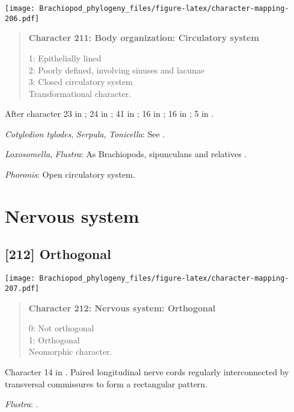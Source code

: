 \documentclass[openany]{book}
\theoremstyle{definition}
\theoremstyle{definition}
\theoremstyle{definition}
\theoremstyle{remark}
\begin{document}
\texttt{[image: Brachiopod\_phylogeny\_files/figure-latex/character-mapping-206.pdf]}

\begin{quote}
\textbf{Character 211: Body organization: Circulatory system}

1: Epithelially lined\\
2: Poorly defined, involving sinuses and lacunae\\
3: Closed circulatory system\\
Transformational character.
\end{quote}

After character 23 in \citet{Haszprunar1996}; 24 in
\citet{Haszprunar2000}; 41 in \citet{Rouse1999}; 16 in
\citet{Scheltema1993}; 16 in \citet{Vinther2008}; 5 in
\citet{Haszprunar2008}.

\hypertarget{Cotyledion_tylodes-coding-211}{}
\emph{Cotyledion tylodes}, \emph{Serpula}, \emph{Tonicella}: See
\citet{Haszprunar2008}.

\hypertarget{Flustra-coding-211}{}
\emph{Loxosomella}, \emph{Flustra}: As Brachiopods, sipunculans and
relatives \citep{Ruppert1983}.

\hypertarget{Phoronis-coding-211}{}
\emph{Phoronis}: Open circulatory system.

\section{Nervous system}\label{nervous-system}

\subsection*{{[}212{]} Orthogonal}\label{orthogonal}

\texttt{[image: Brachiopod\_phylogeny\_files/figure-latex/character-mapping-207.pdf]}

\begin{quote}
\textbf{Character 212: Nervous system: Orthogonal}

0: Not orthogonal\\
1: Orthogonal\\
Neomorphic character.
\end{quote}

Character 14 in \citet{Haszprunar1996}. Paired longitudinal nerve cords
regularly interconnected by transversal commissures to form a
rectangular pattern.

\hypertarget{Flustra-coding-212}{}
\emph{Flustra}: \citet{Temereva2016Thenervous}.
\end{document}
